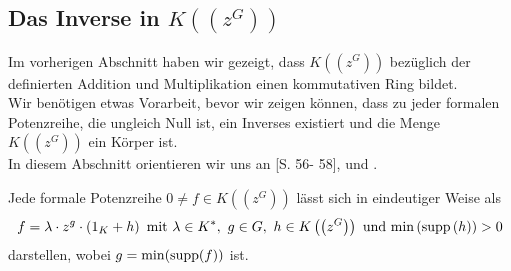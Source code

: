 \subsection{Das Inverse in $K\left(\left(z^{G}\right)\right)$ }
%
%
%
%
%
Im vorherigen Abschnitt haben wir gezeigt, dass $K\left(\left(z^{G}\right)\right)$ bezüglich der definierten Addition und Multiplikation einen kommutativen Ring bildet. \\
Wir benötigen etwas Vorarbeit, bevor wir zeigen können, dass zu jeder formalen Potenzreihe, die ungleich Null ist, ein Inverses existiert und die Menge  $K\left(\left(z^{G}\right)\right)$ ein Körper ist.\\
In diesem Abschnitt orientieren wir uns an \cite{priesscrampe83}[S. 56- 58], \cite[S. 196- 198]{fuchs66} und \cite[S. 210- 213]{neumann49}.
% 
%
%
%
%
%
\begin{satz}\label{JedePotenzreihesoDarstellbar}
Jede formale Potenzreihe $0 \neq f \in K\left(\left(z^{G}\right)\right)$ lässt sich in eindeutiger Weise als  \\
\[f = \lambda\cdot z^g\cdot \left(1_K + h\right)\text{ mit } \lambda \in K^*, ~g \in G,~h \in K\left(\left(z^{G}\right)\right) \text{ und } \textup{min}\left(\textup{supp}\left(h\right)\right) > 0 \] darstellen, wobei $g= \min(\textup{supp}(f))$ ist.
\end{satz}
%
%
